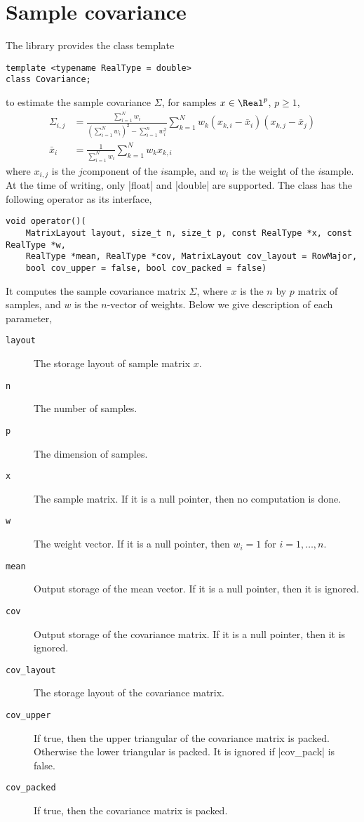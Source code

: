 \section{Sample covariance}
\label{sec:Sample covariance}

The library provides the class template
\begin{verbatim}
template <typename RealType = double>
class Covariance;
\end{verbatim}
to estimate the sample covariance $\Sigma$, for samples $x\in\Real^p$, $p\ge1$,
\begin{align*}
  \Sigma_{i,j} &= \frac{\sum_{i=1}^N w_i}
  {(\sum_{i=1}^N w_i)^2 - \sum_{i=1}^n w_i^2}
  \sum_{k=1}^N w_k (x_{k,i} - \bar{x}_i)(x_{k,j} - \bar{x}_j) \\
  \bar{x}_i &= \frac{1}{\sum_{i=1}^N w_i}\sum_{k=1}^N w_k x_{k,i}
\end{align*}
where $x_{i,j}$ is the $j$\ith component of the $i$\ith sample, and $w_i$ is
the weight of the $i$\ith sample. At the time of writing, only |float| and
|double| are supported. The class has the following operator as its interface,
\begin{verbatim}
void operator()(
    MatrixLayout layout, size_t n, size_t p, const RealType *x, const RealType *w,
    RealType *mean, RealType *cov, MatrixLayout cov_layout = RowMajor,
    bool cov_upper = false, bool cov_packed = false)
\end{verbatim}
It computes the sample covariance matrix $\Sigma$,
where $x$ is the $n$ by $p$ matrix of samples, and $w$ is the $n$-vector of
weights. Below we give description of each parameter,
\begin{description}
  \item[\texttt{layout}] The storage layout of sample matrix $x$.
  \item[\texttt{n}] The number of samples.
  \item[\texttt{p}] The dimension of samples.
  \item[\texttt{x}] The sample matrix. If it is a null pointer, then no
    computation is done.
  \item[\texttt{w}] The weight vector. If it is a null pointer, then $w_i = 1$
    for $i = 1,\dots,n$.
  \item[\texttt{mean}] Output storage of the mean vector. If it is a null
    pointer, then it is ignored.
  \item[\texttt{cov}] Output storage of the covariance matrix. If it is a null
    pointer, then it is ignored.
  \item[\texttt{cov\_layout}] The storage layout of the covariance matrix.
  \item[\texttt{cov\_upper}] If true, then the upper triangular of the
    covariance matrix is packed. Otherwise the lower triangular is packed. It
    is ignored if |cov_pack| is false.
  \item[\texttt{cov\_packed}] If true, then the covariance matrix is
    packed.
\end{description}
